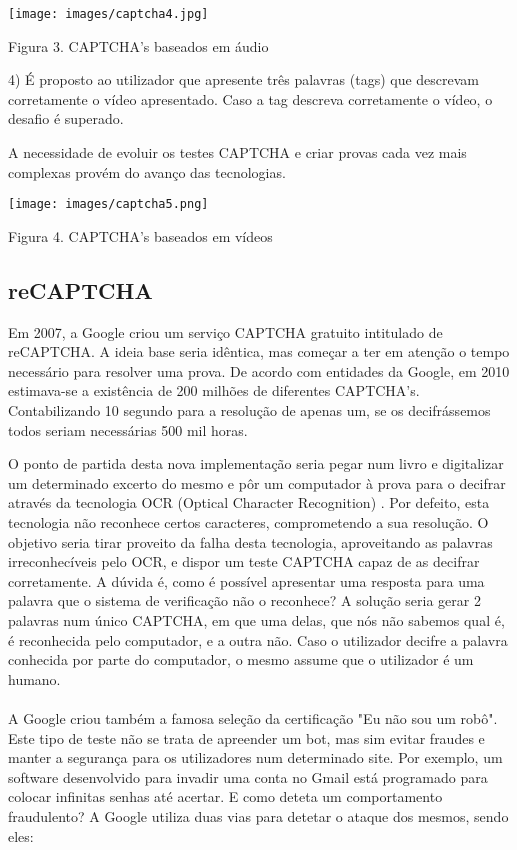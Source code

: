 \documentclass{article}
\begin{document}
\begin{center}
   \texttt{[image: images/captcha4.jpg]}
   \newline
    \caption{Figura 3. CAPTCHA's baseados em áudio}
    \label{fig:my_label}    
\end{center}

4) É proposto ao utilizador que apresente três palavras (tags) que descrevam corretamente o vídeo apresentado. Caso a tag descreva corretamente o vídeo, o desafio é superado. \newline

A necessidade de evoluir os testes CAPTCHA e criar provas cada vez mais complexas provém do avanço das tecnologias. 
\begin{center}
   \texttt{[image: images/captcha5.png]}
   \newline
    \caption{Figura 4. CAPTCHA's baseados em vídeos}
    \label{fig:my_label}    
\end{center}

\subsection{reCAPTCHA}
Em 2007, a Google criou um serviço CAPTCHA gratuito intitulado de reCAPTCHA. A ideia base seria idêntica, mas começar a ter em atenção o tempo necessário para resolver uma prova. De acordo com entidades da Google, em 2010 estimava-se a existência de 200 milhões de diferentes CAPTCHA's. Contabilizando 10 segundo para a resolução de apenas um, se os decifrássemos todos seriam necessárias 500 mil horas. 


	O ponto de partida desta nova implementação seria pegar num livro e digitalizar um determinado excerto do mesmo e pôr um computador à prova para o decifrar através da tecnologia OCR (Optical Character Recognition) \cite{11}. Por defeito, esta tecnologia não reconhece certos caracteres, comprometendo a sua resolução. O objetivo seria tirar proveito da falha desta tecnologia, aproveitando as palavras irreconhecíveis pelo OCR, e dispor um teste CAPTCHA capaz de as decifrar corretamente. A dúvida é, como é possível apresentar uma resposta para uma palavra que o sistema de verificação não o reconhece? A solução seria gerar 2 palavras num único CAPTCHA, em que uma delas, que nós não sabemos qual é, é reconhecida pelo computador, e a outra não. Caso o utilizador decifre a palavra conhecida por parte do computador, o mesmo assume que o utilizador é um humano. \cite{3}\paragraph{} A Google criou também a famosa seleção da certificação "Eu não sou um robô". Este tipo de teste não se trata de apreender um bot, mas sim evitar fraudes e manter a segurança para os utilizadores num determinado site. Por exemplo, um software desenvolvido para invadir uma conta no Gmail está programado para colocar infinitas senhas até acertar\cite{4}.  E como deteta um comportamento fraudulento? A Google utiliza duas vias para detetar o ataque dos mesmos, sendo eles:  \cite{6}
\end{document}
